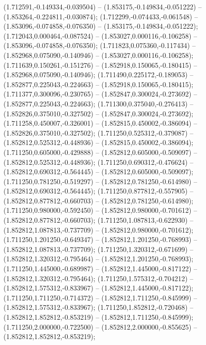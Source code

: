  (1.712591,-0.149334,-0.039504) -- (1.853175,-0.149834,-0.051222) -- (1.853264,-0.224811,-0.030874);
 (1.712299,-0.074433,-0.061548) -- (1.853096,-0.074858,-0.076350) -- (1.853175,-0.149834,-0.051222);
 (1.712043,0.000464,-0.087524) -- (1.853027,0.000116,-0.106258) -- (1.853096,-0.074858,-0.076350);
 (1.711823,0.075360,-0.117434) -- (1.852968,0.075090,-0.140946) -- (1.853027,0.000116,-0.106258);
 (1.711639,0.150261,-0.151276) -- (1.852918,0.150065,-0.180415) -- (1.852968,0.075090,-0.140946);
 (1.711490,0.225172,-0.189053) -- (1.852877,0.225043,-0.224663) -- (1.852918,0.150065,-0.180415);
 (1.711377,0.300096,-0.230765) -- (1.852847,0.300024,-0.273692) -- (1.852877,0.225043,-0.224663);
 (1.711300,0.375040,-0.276413) -- (1.852826,0.375010,-0.327502) -- (1.852847,0.300024,-0.273692);
 (1.711258,0.450007,-0.326001) -- (1.852815,0.450002,-0.386094) -- (1.852826,0.375010,-0.327502);
 (1.711250,0.525312,-0.379087) -- (1.852812,0.525312,-0.448936) -- (1.852815,0.450002,-0.386094);
 (1.711250,0.605000,-0.429888) -- (1.852812,0.605000,-0.509097) -- (1.852812,0.525312,-0.448936);
 (1.711250,0.690312,-0.476624) -- (1.852812,0.690312,-0.564445) -- (1.852812,0.605000,-0.509097);
 (1.711250,0.781250,-0.519297) -- (1.852812,0.781250,-0.614980) -- (1.852812,0.690312,-0.564445);
 (1.711250,0.877812,-0.557905) -- (1.852812,0.877812,-0.660703) -- (1.852812,0.781250,-0.614980);
 (1.711250,0.980000,-0.592450) -- (1.852812,0.980000,-0.701612) -- (1.852812,0.877812,-0.660703);
 (1.711250,1.087813,-0.622930) -- (1.852812,1.087813,-0.737709) -- (1.852812,0.980000,-0.701612);
 (1.711250,1.201250,-0.649347) -- (1.852812,1.201250,-0.768993) -- (1.852812,1.087813,-0.737709);
 (1.711250,1.320312,-0.671699) -- (1.852812,1.320312,-0.795464) -- (1.852812,1.201250,-0.768993);
 (1.711250,1.445000,-0.689987) -- (1.852812,1.445000,-0.817122) -- (1.852812,1.320312,-0.795464);
 (1.711250,1.575312,-0.704212) -- (1.852812,1.575312,-0.833967) -- (1.852812,1.445000,-0.817122);
 (1.711250,1.711250,-0.714372) -- (1.852812,1.711250,-0.845999) -- (1.852812,1.575312,-0.833967);
 (1.711250,1.852812,-0.720468) -- (1.852812,1.852812,-0.853219) -- (1.852812,1.711250,-0.845999);
 (1.711250,2.000000,-0.722500) -- (1.852812,2.000000,-0.855625) -- (1.852812,1.852812,-0.853219);
